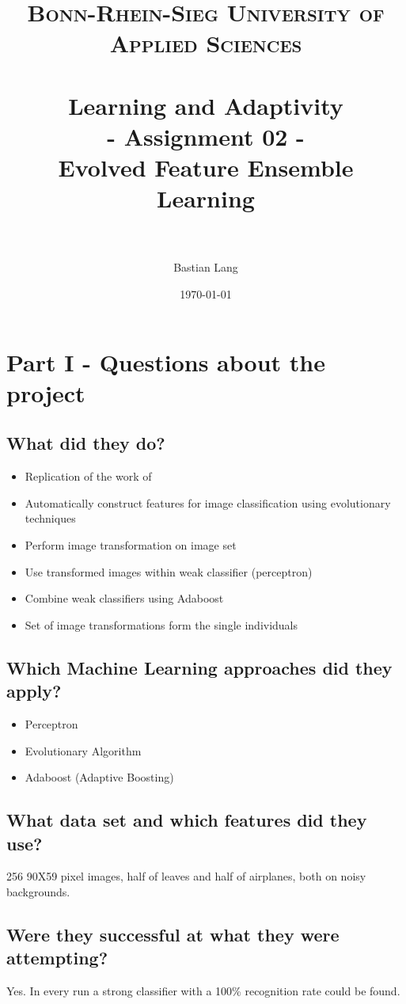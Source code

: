 \documentclass[paper=a4, fontsize=11pt]{scrartcl} %
\title{	
\normalfont \normalsize 
\textsc{Bonn-Rhein-Sieg University of Applied Sciences} \\ [25pt] %
\horrule{0.5pt} \\[0.4cm] %
\huge Learning and Adaptivity\\
- Assignment 02 - \\
Evolved Feature Ensemble Learning\\ %
\horrule{2pt} \\[0.5cm] %
}
\author{Bastian Lang} %
\date{\normalsize\today} %
\numberwithin{equation}{section} %
\numberwithin{figure}{section} %
\numberwithin{table}{section} %
\begin{document}
\maketitle %

\tableofcontents
\newpage

\section{Part I - Questions about the project}
\subsection{What did they do?}
\begin{itemize}
	\item Replication of the work of \cite{lillywhite2013feature}
	\item Automatically construct features for image classification using evolutionary techniques
	\item Perform image transformation on image set
	\item Use transformed images within weak classifier (perceptron)
	\item Combine weak classifiers using Adaboost
	\item Set of image transformations form the single individuals
\end{itemize}
\subsection{Which Machine Learning approaches did they apply?}
\begin{itemize}
	\item Perceptron
	\item Evolutionary Algorithm
	\item Adaboost (Adaptive Boosting)
\end{itemize}
\subsection{What data set and which features did they use?}
256 90X59 pixel images, half of leaves and half of airplanes, both on noisy backgrounds.
\subsection{Were they successful at what they were attempting?}
Yes. In every run a strong classifier with a 100\% recognition rate could be found.
\end{document}
